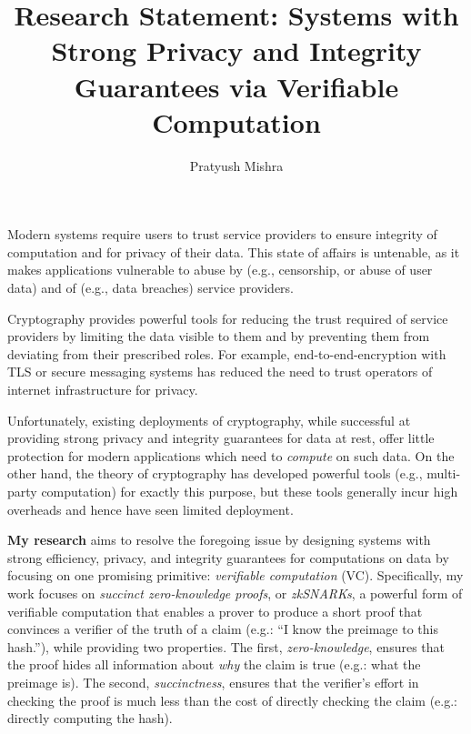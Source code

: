 \documentclass[11pt,letterpaper]{article}
\theoremstyle{definition} %
\theoremstyle{remark} %
\begin{document}

\title{Research Statement: Systems with Strong Privacy and Integrity Guarantees via Verifiable Computation}
\author{Pratyush Mishra}
\date{}


\maketitle
\vspace{-1cm}

Modern systems require users to trust service providers to ensure integrity of computation and for privacy of their data. 
This state of affairs is untenable, as it makes applications vulnerable to abuse by (e.g., censorship, or abuse of user data) and of (e.g., data breaches) service providers.

Cryptography provides powerful tools for reducing the trust required of service providers by limiting the data visible to them and by preventing them from deviating from their prescribed roles. 
For example, end-to-end-encryption with TLS or secure messaging systems has reduced the need to trust operators of internet infrastructure for privacy.

Unfortunately, existing deployments of cryptography, while successful at providing strong privacy and integrity guarantees for data at rest, offer little protection for modern applications which need to \emph{compute} on such data.
On the other hand, the theory of cryptography has developed powerful tools (e.g., multi-party computation) for exactly this purpose, but these tools generally incur high overheads and hence have seen limited deployment.

\textbf{My research} aims to resolve the foregoing issue by designing systems with strong efficiency, privacy, and integrity guarantees for computations on data by focusing on one promising primitive: \emph{verifiable computation} (VC).
Specifically, my work focuses on \emph{succinct zero-knowledge proofs}, or \emph{zkSNARKs}, a powerful form of verifiable computation that enables a prover to produce a short proof that convinces a verifier of the truth of a claim (e.g.: ``I know the preimage to this hash.''), while providing two properties. 
The first, \emph{zero-knowledge}, ensures that the proof hides all information about \emph{why} the claim is true (e.g.: what the preimage is). 
The second, \emph{succinctness}, ensures that the verifier's effort in checking the proof is much less than the cost of directly checking the claim (e.g.: directly computing the hash).
\end{document}
